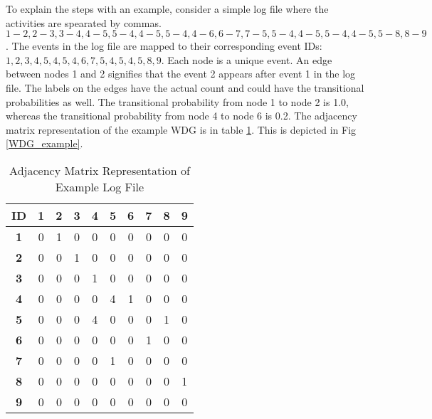 \begin{enumerate}
\begin{enumerate}
To explain the steps with an example, consider a simple log file where the activities are spearated by commas. $1-2, 2-3, 3-4, 4-5, 5-4, 4-5, 5-4, 4-6, 6-7, 7-5, 5-4, 4-5, 5-4, 4-5, 5-8, 8-9$. The events in the log file are mapped to their corresponding event IDs: $1, 2, 3, 4, 5, 4, 5, 4, 6, 7, 5, 4, 5, 4, 5, 8, 9$. Each node is a unique event. An edge between nodes 1 and 2 signifies that the event 2  appears after event 1  in the log file. The labels on the edges have the actual count and could have the transitional probabilities as well. The transitional probability from node 1 to node 2 is 1.0, whereas the transitional probability from node 4 to node 6 is 0.2. The adjacency matrix representation of the example WDG is in table \ref{Adjacency_example_log}. This is depicted in Fig \ref{WDG_example}.

\begin{table}[!t]
\caption{Adjacency Matrix Representation of Example Log File}
\label{Adjacency_example_log}
\centering
\begin{tabular}{|c|c|c|c|c|c|c|c|c|c|}
\hline
  {\bf ID} &    {\bf 1} &    {\bf 2} &    {\bf 3} &    {\bf 4} &    {\bf 5} &    {\bf 6} &    {\bf 7} &    {\bf 8} &    {\bf 9} \\
\hline
   {\bf 1} &          0 &          1 &          0 &          0 &          0 &          0 &          0 &          0 &          0 \\
\hline
   {\bf 2} &          0 &          0 &          1 &          0 &          0 &          0 &          0 &          0 &          0 \\
\hline
   {\bf 3} &          0 &          0 &          0 &          1 &          0 &          0 &          0 &          0 &          0 \\
\hline
   {\bf 4} &          0 &          0 &          0 &          0 &          4 &          1 &          0 &          0 &          0 \\
\hline
   {\bf 5} &          0 &          0 &          0 &          4 &          0 &          0 &          0 &          1 &          0 \\
\hline
   {\bf 6} &          0 &          0 &          0 &          0 &          0 &          0 &          1 &          0 &          0 \\
\hline
   {\bf 7} &          0 &          0 &          0 &          0 &          1 &          0 &          0 &          0 &          0 \\
\hline
   {\bf 8} &          0 &          0 &          0 &          0 &          0 &          0 &          0 &          0 &          1 \\
\hline
   {\bf 9} &          0 &          0 &          0 &          0 &          0 &          0 &          0 &          0 &          0 \\
\hline
\end{tabular}  
\end{table} 


\end{enumerate}
\end{enumerate}
